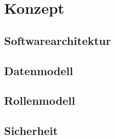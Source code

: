 \chapter{Konzept}

\section{Softwarearchitektur}

\section{Datenmodell}

\section{Rollenmodell}

\section{Sicherheit}
